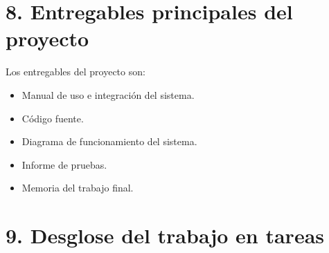 \documentclass[
11pt, %
]{charter}
\begin{document}
\section{8. Entregables principales del proyecto}
\label{sec:entregables}

Los entregables del proyecto son:

\begin{itemize}
	\item Manual de uso e integración del sistema.
	\item Código fuente.
	\item Diagrama de funcionamiento del sistema.
	\item Informe de pruebas.
	\item Memoria del trabajo final.
\end{itemize}

\section{9. Desglose del trabajo en tareas}
\label{sec:wbs}
\end{document}
